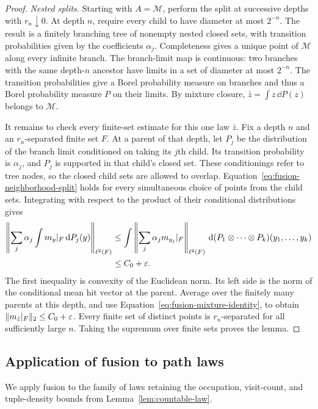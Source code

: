 \begin{proof}
\smallskip\noindent
\emph{Nested splits.}
Starting with \(A=\mathcal M\), perform the split at successive depths
with \(r_n\downarrow0\).  At depth \(n\), require every child to have
diameter at most \(2^{-n}\).  The result is a finitely branching tree of
nonempty nested closed sets, with transition probabilities given by the
coefficients \(\alpha_j\).  Completeness gives a unique point of
\(\mathcal M\) along every infinite branch.  The branch-limit map is
continuous: two branches with the same depth-\(n\) ancestor have limits
in a set of diameter at most \(2^{-n}\).  The transition probabilities
give a Borel probability measure on branches and thus a Borel probability
measure \(P\) on their limits.  By mixture closure,
\(\bar z=\int z\,\dd P(z)\) belongs to \(\mathcal M\).

It remains to check every finite-set estimate for this one law $\bar z$.
Fix a depth \(n\) and an \(r_n\)-separated finite set \(F\).  At a parent
of that depth, let $P_j$ be the distribution of the branch limit
conditioned on taking its $j$th child.  Its transition probability is
$\alpha_j$, and $P_j$ is supported in that child's closed set.  These
conditionings refer to tree nodes, so the closed child sets are allowed
to overlap.  Equation~\eqref{eq:fusion-neighborhood-split} holds for
every simultaneous choice of points from the child sets.  Integrating
with respect to the product of their conditional distributions gives
\[
 \begin{split}
 \left\|\sum_j\alpha_j\int m_y|_F\,\mathrm d P_j(y)\right\|_{\ell^2(F)}
 &\le
 \int\left\|\sum_j\alpha_jm_{y_j}|_F\right\|_{\ell^2(F)}
       \,\mathrm d(P_1\otimes\cdots\otimes P_k)(y_1,\ldots,y_k)\\
 &\le C_0+\varepsilon.
 \end{split}
\]
The first inequality is convexity of the Euclidean norm.  Its left side
is the norm of the conditional mean hit vector at the parent.
Average over the finitely many
parents at this depth, and use
Equation~\eqref{eq:fusion-mixture-identity}, to obtain
\(\|m_{\bar z}|_F\|_2\le C_0+\varepsilon\).
Every finite set of distinct points is \(r_n\)-separated for all
sufficiently large \(n\).  Taking the supremum over finite sets proves
the lemma.
\end{proof}

\subsection{Application of fusion to path laws}

We apply fusion to the family of laws retaining the occupation,
visit-count, and tuple-density bounds from
Lemma~\ref{lem:countable-law}.

